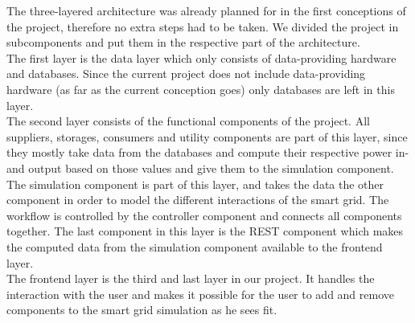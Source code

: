 The three-layered architecture was already planned for in the first conceptions of the project, therefore no extra steps had to be taken.
We divided the project in subcomponents and put them in the respective part of the architecture.\\
The first layer is the data layer which only consists of data-providing hardware and databases. 
Since the current project does not include data-providing hardware (as far as the current conception goes) only databases are left in this layer.\\
The second layer consists of the functional components of the project.
All suppliers, storages, consumers and utility components are part of this layer, since they mostly take data from the databases and compute their respective power in- and output based on those values and give them to the simulation component.
The simulation component is part of this layer, and takes the data the other component in order to model the different interactions of the smart grid.
The workflow is controlled by the controller component and connects all components together.
The last component in this layer is the REST component which makes the computed data from the simulation component available to the frontend layer.\\
The frontend layer is the third and last layer in our project.
It handles the interaction with the user and makes it possible for the user to add and remove components to the smart grid simulation as he sees fit.